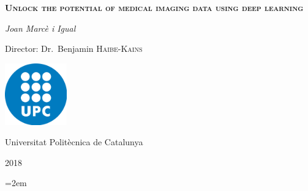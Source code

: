 \documentclass[a4paper, 12pt]{article}
\begin{document}
\begin{titlepage}
    \centering
    \vspace{1.5cm}
    {\huge \textbf{\textsc{Unlock the potential of medical imaging data using deep learning}} \par}
    \vspace{2cm}
    {\Large \textit{Joan Marcè i Igual}\par}
    \vfill
    Director: Dr.~Benjamin \textsc{Haibe-Kains}
    
    \vfill

    \includegraphics[width=0.2\textwidth]{images/logo_upc}\par\vspace{1cm}
    \vfill
    
    {\LARGE Universitat Politècnica de Catalunya \par}
    {\LARGE 2018 \par}
\end{titlepage}

\tableofcontents

\pagebreak





\pagebreak
\emergencystretch=2em
\printbibliography{}
\end{document}
